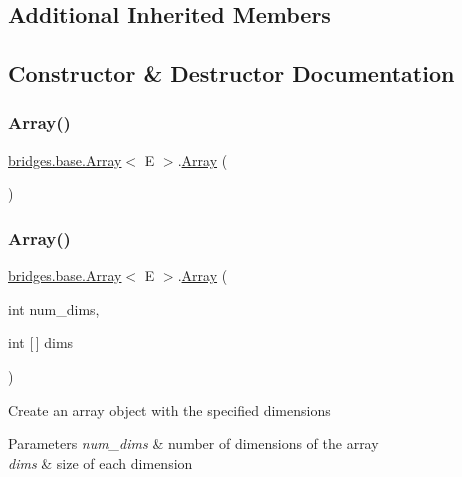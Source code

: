 \subsection*{Additional Inherited Members}


\subsection{Constructor \& Destructor Documentation}
\mbox{\label{classbridges_1_1base_1_1_array_ad5dbf7bbd9811c2dac16a5c135465d4b}} 
\subsubsection{\texorpdfstring{Array()}{Array()}\hspace{0.1cm}{\footnotesize\ttfamily [1/2]}}
{\footnotesize\ttfamily \hyperlink{classbridges_1_1base_1_1_array}{bridges.\+base.\+Array}$<$ E $>$.\hyperlink{classbridges_1_1base_1_1_array}{Array} (\begin{DoxyParamCaption}{ }\end{DoxyParamCaption})}

\mbox{\label{classbridges_1_1base_1_1_array_ab37dbe6efe0c34242456971e430763f7}} 
\subsubsection{\texorpdfstring{Array()}{Array()}\hspace{0.1cm}{\footnotesize\ttfamily [2/2]}}
{\footnotesize\ttfamily \hyperlink{classbridges_1_1base_1_1_array}{bridges.\+base.\+Array}$<$ E $>$.\hyperlink{classbridges_1_1base_1_1_array}{Array} (\begin{DoxyParamCaption}\item[{int}]{num\+\_\+dims,  }\item[{int \mbox{[}$\,$\mbox{]}}]{dims }\end{DoxyParamCaption})}

Create an array object with the specified dimensions


\begin{DoxyParams}{Parameters}
{\em num\+\_\+dims} & number of dimensions of the array \\
\hline
{\em dims} & size of each dimension \\
\hline
\end{DoxyParams}


